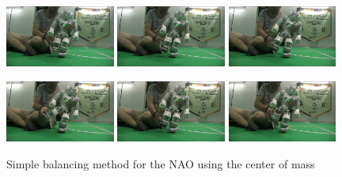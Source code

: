 \begin{figure}[!t]
\centerline{
\includegraphics[width=0.32\textwidth]{Figures/Demo2/1.png}
\includegraphics[width=0.32\textwidth]{Figures/Demo2/2.png}
\includegraphics[width=0.32\textwidth]{Figures/Demo2/3.png}
}
\vspace*{0.06cm}
\centerline{
\includegraphics[width=0.32\textwidth]{Figures/Demo2/4.png}
\includegraphics[width=0.32\textwidth]{Figures/Demo2/5.png}
\includegraphics[width=0.32\textwidth]{Figures/Demo2/6.png}
}
\caption{Simple balancing method for the NAO using the center of mass}
\label{demo2}
\end{figure}
